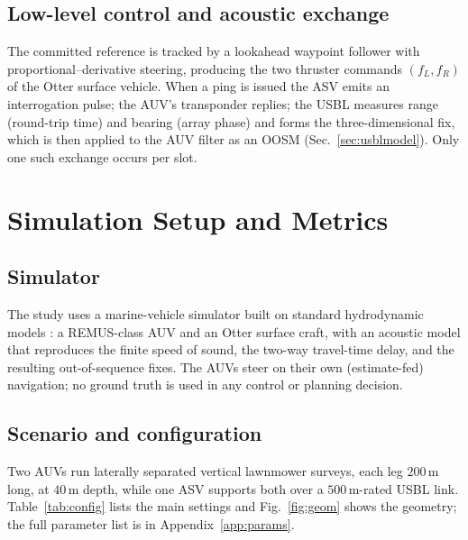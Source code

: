 \documentclass[12pt,a4paper,oneside]{book}
\newcommand{\figref}[1]{Fig.~\ref{#1}}
\newcommand{\tabref}[1]{Table~\ref{#1}}
\newcommand{\secref}[1]{Sec.~\ref{#1}}
\begin{document}
\section{Low-level control and acoustic exchange}
The committed reference is tracked by a lookahead waypoint follower with proportional--derivative steering,
producing the two thruster commands $(f_L,f_R)$ of the Otter surface vehicle. When a ping is issued the ASV
emits an interrogation pulse; the AUV's transponder replies; the USBL measures range (round-trip time) and
bearing (array phase) and forms the three-dimensional fix, which is then applied to the AUV filter as an
OOSM (\secref{sec:usblmodel}). Only one such exchange occurs per slot.

\chapter{Simulation Setup and Metrics}
\label{ch:setup}

\section{Simulator}
The study uses a marine-vehicle simulator built on standard hydrodynamic models \cite{fossen2011handbook}:
a REMUS-class AUV and an Otter surface craft, with an acoustic model that reproduces the finite speed of
sound, the two-way travel-time delay, and the resulting out-of-sequence fixes. The AUVs steer on their own
(estimate-fed) navigation; no ground truth is used in any control or planning decision.

\section{Scenario and configuration}
Two AUVs run laterally separated vertical lawnmower surveys, each leg $200$\,m long, at $40$\,m depth, while
one ASV supports both over a $500$\,m-rated USBL link. \tabref{tab:config} lists the main settings and
\figref{fig:geom} shows the geometry; the full parameter list is in Appendix~\ref{app:params}.
\end{document}
